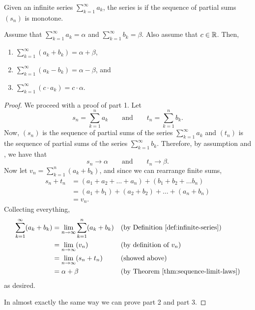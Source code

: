 \begin{definition}
  Given an infinite series $\sum_{k = 1}^{\infty} a_k$, the series is
   if the sequence of partial sums $(s_n)$ is monotone.
\end{definition}

\begin{theorem}
  Assume that $\sum_{k = 1}^{\infty} a_k = \alpha$ and $\sum_{k =
  1}^{\infty} b_k = \beta$.
  Also assume that $c \in \mathbb R$. Then,
  \begin{enumerate}
    \item $\sum_{k = 1}^{\infty} (a_k + b_k) = \alpha + \beta$,
    \item $\sum_{k = 1}^{\infty} (a_k - b_k) = \alpha - \beta$, and
    \item $\sum_{k = 1}^{\infty} (c \cdot a_k) = c \cdot \alpha$.
  \end{enumerate}
\end{theorem}

\begin{proof}
  We proceed with a proof of part 1. Let
  \[ s_n = \sum_{k = 1}^{n} a_k \qquad \text{and} \qquad t_n =
  \sum_{k = 1}^{n} b_k. \]
  Now, $(s_n)$ is the sequence of partial sums of the series $\sum_{k
  = 1}^{\infty} a_k$ and $(t_n)$ is the sequence of partial sums of
  the series $\sum_{k = 1}^{\infty} b_k$. Therefore, by assumption
  and , we have that
  \[ s_n \to \alpha \qquad \text{and} \qquad t_n \to \beta. \]
  Now let $v_n = \sum_{k = 1}^{n} (a_k + b_k)$, and since we can
  rearrange finite sums,
  \begin{align*}
    s_n + t_n & = (a_1 + a_2 + \dots + a_n) + (b_1 + b_2 + \dots b_n) \\
    & = (a_1 + b_1) + (a_2 + b_2) + \dots + (a_n + b_n) \\
    & = v_n.
  \end{align*}
  Collecting everything,
  \begin{align*}
    \sum_{k = 1}^{\infty} (a_k + b_k) & = \lim_{n \to \infty} \sum_{k = 1}^{n}
    (a_k + b_k) && \text{(by \defref{infinite-series})} \\
    & = \lim_{n \to \infty} (v_n) && \text{(by definition of $v_n$)} \\
    & = \lim_{n \to \infty} (s_n + t_n) && \text{(showed above)} \\
    & = \alpha + \beta && \text{(by \thmref{sequence-limit-laws})}
  \end{align*}
  as desired.

  In almost exactly the same way we can prove part 2 and part 3.
\end{proof}

